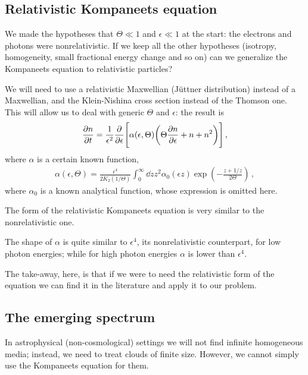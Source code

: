 \documentclass[main.tex]{subfiles}
\begin{document}

\subsection{Relativistic Kompaneets equation}

We made the hypotheses that \(\Theta \ll 1\) and \(\epsilon \ll 1\) at the start: the electrons and photons were nonrelativistic.
If we keep all the other hypotheses (isotropy, homogeneity, small fractional energy change and so on) can we generalize the Kompaneets equation to relativistic particles?

We will need to use a relativistic Maxwellian (Jüttner distribution) instead of a Maxwellian, and the Klein-Nishina cross section instead of the Thomson one. This will allow us to deal with generic \(\Theta \) and \(\epsilon \): the result is 
%
\begin{align}
\pdv{n}{t} = \frac{1}{\epsilon^2} \pdv{}{\epsilon } \qty[ \alpha (\epsilon , \Theta ) \qty(\Theta \pdv{n}{\epsilon } + n + n^2)]
\,,
\end{align}
%
where \(\alpha \) is a certain known function, 
%
\begin{align}
\alpha (\epsilon , \Theta ) = \frac{\epsilon^4}{2 K_2 (1 / \Theta )} \int_0^{\infty } \dd{z} z^2 \alpha_0 (\epsilon z) \exp( - \frac{z + 1/z}{2 \Theta })
\,,
\end{align}
%
where \(\alpha_0\) is a known analytical function, whose expression is omitted here. 

The form of the relativistic Kompaneets equation is very similar to the nonrelativistic one. 

The shape of \(\alpha \) is quite similar to \(\epsilon^4\), its nonrelativistic counterpart, for low photon energies; while for high photon energies \(\alpha \) is lower than \(\epsilon^4\). 

The take-away, here, is that if we were to need the relativistic form of the equation we can find it in the literature and apply it to our problem.

\subsection{The emerging spectrum}

In astrophysical (non-cosmological) settings we will not find infinite homogeneous media; instead, we need to treat clouds of finite size. 
However, we cannot simply use the Kompaneets equation for them.
\end{document}
